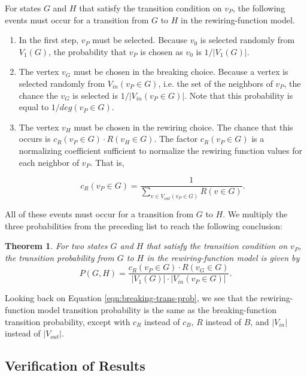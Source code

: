 \documentclass[a4paper,10pt]{article}
\newtheorem{theorem}{Theorem}
\begin{document}
For states $G$ and $H$ that satisfy the transition condition on $v_P$, the following events must occur for a transition from $G$ to $H$ in the rewiring-function model.

\begin{enumerate}
 \item In the first step, $v_P$ must be selected. Because $v_0$ is selected randomly from $V_1(G)$, the probability that $v_P$ is chosen as $v_0$ is $1 / |V_1(G)|$.
 \item The vertex $v_G$ must be chosen in the breaking choice. Because a vertex is selected randomly from $V_{in}(v_P \in G)$, i.e. the set of the neighbors of $v_P$,  the chance the $v_G$ is selected is $1/|V_{in}(v_P \in G)|$. Note that this probability is equal to $1 / deg(v_P \in G)$. 

 \item The vertex $v_H$ must be chosen in the rewiring choice. The chance that this occurs is $c_R(v_P \in G) \cdot R(v_H \in G)$. The factor $c_R(v_P \in G)$ is a normalizing coefficient sufficient to normalize the rewiring function values for each neighbor of $v_P$. That is,

   \begin{equation}
    c_R(v_P \in G) = \frac{1}{\sum \limits_{v \in V_{out}(v_P \in G)} R(v \in G)}.
   \end{equation}
\end{enumerate}

All of these events must occur for a transition from $G$ to $H$. We multiply the three probabilities from the preceding list to reach the following conclusion:

\begin{theorem}
\label{thm:rewiring-trans-prob}
For two states $G$ and $H$ that satisfy the transition condition on $v_P$, the transition probability from $G$ to $H$ in the rewiring-function model is given by
\begin{equation}
\label{eqn:rewiring-trans-prob}
P(G, H) = \frac{c_R(v_P \in G) \cdot R(v_G \in G)}{|V_1(G)| \cdot |V_{in}(v_P \in G)|}.
\end{equation}
\end{theorem}

Looking back on Equation \ref{eqn:breaking-trans-prob}, we see that the rewiring-function model transition probability is the same as the breaking-function transition probability, except with $c_R$ instead of $c_B$, $R$ instead of $B$, and $|V_{in}|$ instead of $|V_{out}|$.

\subsection{Verification of Results}
\end{document}
